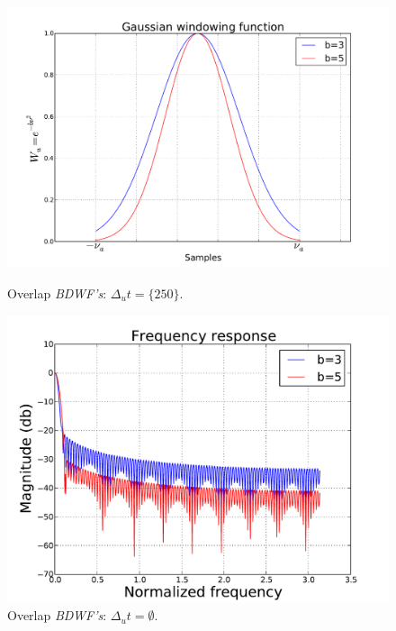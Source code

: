 \documentclass[useAMS,usenatbib]{mn2e}
\begin{document}
\begin{figure}
\begin{minipage}{0.36\linewidth}\includegraphics[width=1\textwidth]{./Figures/gausian.pdf}\caption{Overlap 
		\textit{BDWF's}: $\Delta_u t=\{250\}$.}\label{fig:fig_gauss}\end{minipage}
\begin{minipage}{0.36\linewidth}\includegraphics[width=1\textwidth]{./Figures/freq_resp_gaussian.pdf}\caption{Overlap 
		\textit{BDWF's}: $\Delta_u t=\emptyset$.}\label{fig:fig_gauss_freq}\end{minipage}
\end{figure}
\end{document}
